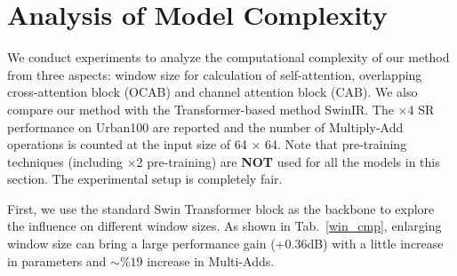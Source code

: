 \documentclass[10pt,twocolumn,letterpaper]{article}
\begin{document}
\section{Analysis of Model Complexity}
We conduct experiments to analyze the computational complexity of our method from three aspects: window size for calculation of self-attention, overlapping cross-attention block (OCAB) and channel attention block (CAB). We also compare our method with the Transformer-based method SwinIR. The $\times$4 SR performance on Urban100 are reported and the number of Multiply-Add operations is counted at the input size of 64 $\times$ 64. Note that pre-training techniques (including $\times$2 pre-training) are \textbf{NOT} used for all the models in this section. The experimental setup is completely fair.

First, we use the standard Swin Transformer block as the backbone to explore the influence on different window sizes. As shown in Tab.~\ref{win_cmp}, enlarging window size can bring a large performance gain (+0.36dB) with a little increase in parameters and $\sim$$\%19$ increase in Multi-Adds. 



\begin{table}[!t]
\center
\begin{center}
\vspace{6.1cm}
\caption{Model complexity comparison of window sizes.}
\label{win_cmp}
\end{center}
\end{table}

\begin{table}[!t]
\center
\begin{center}
\caption{Model complexity comparison of OCAB and CAB.}
\label{modules_cmp}
\end{center}
\end{table}
\end{document}
